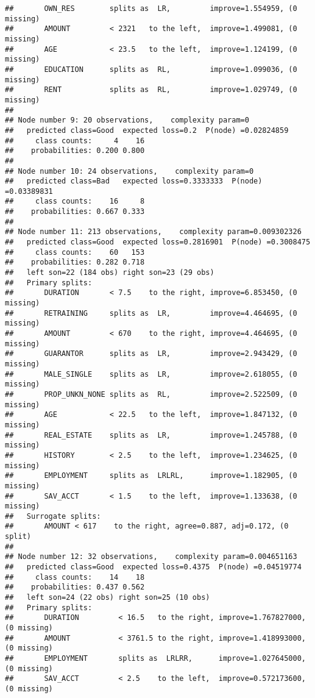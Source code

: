 \documentclass[
]{article}
\begin{document}
\begin{verbatim}
##       OWN_RES        splits as  LR,         improve=1.554959, (0 missing)
##       AMOUNT         < 2321   to the left,  improve=1.499081, (0 missing)
##       AGE            < 23.5   to the left,  improve=1.124199, (0 missing)
##       EDUCATION      splits as  RL,         improve=1.099036, (0 missing)
##       RENT           splits as  RL,         improve=1.029749, (0 missing)
## 
## Node number 9: 20 observations,    complexity param=0
##   predicted class=Good  expected loss=0.2  P(node) =0.02824859
##     class counts:     4    16
##    probabilities: 0.200 0.800 
## 
## Node number 10: 24 observations,    complexity param=0
##   predicted class=Bad   expected loss=0.3333333  P(node) =0.03389831
##     class counts:    16     8
##    probabilities: 0.667 0.333 
## 
## Node number 11: 213 observations,    complexity param=0.009302326
##   predicted class=Good  expected loss=0.2816901  P(node) =0.3008475
##     class counts:    60   153
##    probabilities: 0.282 0.718 
##   left son=22 (184 obs) right son=23 (29 obs)
##   Primary splits:
##       DURATION       < 7.5    to the right, improve=6.853450, (0 missing)
##       RETRAINING     splits as  LR,         improve=4.464695, (0 missing)
##       AMOUNT         < 670    to the right, improve=4.464695, (0 missing)
##       GUARANTOR      splits as  LR,         improve=2.943429, (0 missing)
##       MALE_SINGLE    splits as  LR,         improve=2.618055, (0 missing)
##       PROP_UNKN_NONE splits as  RL,         improve=2.522509, (0 missing)
##       AGE            < 22.5   to the left,  improve=1.847132, (0 missing)
##       REAL_ESTATE    splits as  LR,         improve=1.245788, (0 missing)
##       HISTORY        < 2.5    to the left,  improve=1.234625, (0 missing)
##       EMPLOYMENT     splits as  LRLRL,      improve=1.182905, (0 missing)
##       SAV_ACCT       < 1.5    to the left,  improve=1.133638, (0 missing)
##   Surrogate splits:
##       AMOUNT < 617    to the right, agree=0.887, adj=0.172, (0 split)
## 
## Node number 12: 32 observations,    complexity param=0.004651163
##   predicted class=Good  expected loss=0.4375  P(node) =0.04519774
##     class counts:    14    18
##    probabilities: 0.437 0.562 
##   left son=24 (22 obs) right son=25 (10 obs)
##   Primary splits:
##       DURATION         < 16.5   to the right, improve=1.767827000, (0 missing)
##       AMOUNT           < 3761.5 to the right, improve=1.418993000, (0 missing)
##       EMPLOYMENT       splits as  LRLRR,      improve=1.027645000, (0 missing)
##       SAV_ACCT         < 2.5    to the left,  improve=0.572173600, (0 missing)

\end{verbatim}
\end{document}
